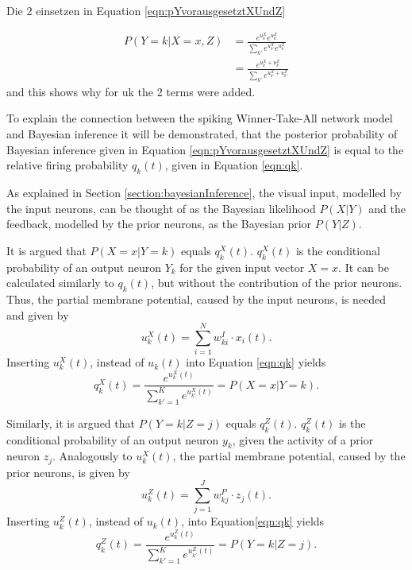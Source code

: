 Die 2 einsetzen in Equation \ref{eqn:pYvorausgesetztXUndZ}

\begin{equation}
\begin{split}
P(Y=k|X=x,Z) &= \frac{e^{u^X_k} e^{u^Z_k}}{\sum_{k'} e^{u^X_{k'}} e^{u^Z_{k'}}}\\
&= \frac{e^{u^X_k + u^Z_k}}{\sum_{k'} e^{u^X_{k'} + u^Z_{k'}}}
\end{split}
\end{equation}
and this shows why for uk the 2 terms were added.

To explain the connection between the spiking Winner-Take-All network model and Bayesian inference it will be demonstrated, that the posterior probability of Bayesian inference given in Equation \ref{eqn:pYvorausgesetztXUndZ} is equal to the relative firing probability $q_k(t)$, given in Equation \ref{eqn:qk}.

As explained in Section \ref{section:bayesianInference}, the visual input, modelled by the input neurons, can be thought of as the Bayesian likelihood $P(X|Y)$ and the feedback, modelled by the prior neurons, as the Bayesian prior $P(Y|Z)$.

It is argued that $P(X=x|Y=k)$ equals $q_k^X(t)$. $q_k^X(t)$ is the conditional probability of an output neuron $Y_k$ for the given input vector $X=x$. It can be calculated similarly to $q_k(t)$, but without the contribution of the prior neurons. Thus, the partial membrane potential, caused by the input neurons, is needed and given by 
\begin{equation}
u_k^X(t) = \sum_{i=1}^N w^{I}_{ki} \cdot x_i(t).
\end{equation}
Inserting $u_k^X(t)$, instead of $u_k(t)$ into Equation \ref{eqn:qk} yields
\begin{equation}
q_k^X(t) = \frac{e^{u_k^X(t)}}{\sum_{k'=1}^K e^{u_{k'}^X(t)}} = P(X=x|Y=k).
\end{equation}

Similarly, it is argued that $P(Y=k|Z=j)$ equals $q_k^Z(t)$. $q_k^Z(t)$ is the conditional probability of an output neuron $y_k$, given the activity of a prior neuron $z_j$.  
Analogously to $u_k^X(t)$, the partial membrane potential, caused by the prior neurons, is given by
\begin{equation}
u_k^Z(t) = \sum_{j=1}^J w^{P}_{kj} \cdot z_j(t).
\end{equation}
Inserting $u_k^Z(t)$, instead of $u_k(t)$, into Equation\ref{eqn:qk} yields
\begin{equation}
q_k^Z(t) = \frac{e^{u_k^Z(t)}}{\sum_{k'=1}^K e^{u_{k'}^Z(t)}} = P(Y=k|Z=j).
\end{equation}

